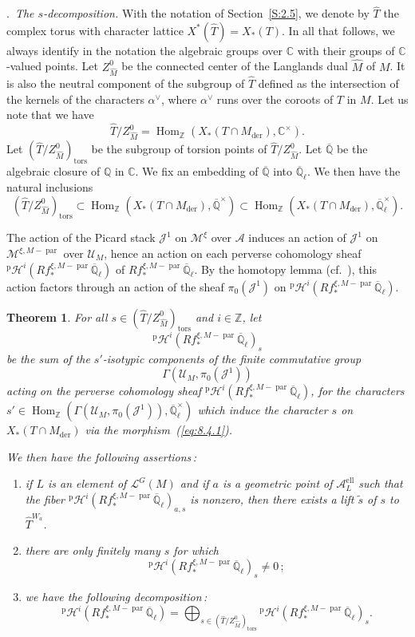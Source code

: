\documentclass[12pt,a4paper,oneside,english,leqno]{smfart}
\makeatletter
\numberwithin{equation}{subsection}
\newcounter{theo}
\numberwithin{theo}{subsection}
\newenvironment{paragr}[1][]{\medskip\refstepcounter{subsection}%
  \par\noindent\hspace*{\parindent}\thesubsection.\ \emph{#1}%
  \@ifundefined{@empty}{}{}\ignorespaces}{\medskip}
\theoremstyle{plain}
\newtheorem{theorem}[theo]{Theorem}
\theoremstyle{definition}
\theoremstyle{remark}
\DeclareMathOperator{\der}{der}
\DeclareMathOperator{\el}{ell}
\DeclareMathOperator{\Hom}{Hom}
\DeclareMathOperator{\tors}{tors}
\DeclareMathOperator{\parab}{par}
\newcommand{\ZZ}{\mathbb{Z}}
\newcommand{\CC}{\mathbb{C}}
\newcommand{\QQ}{\mathbb{Q}}
\newcommand{\Qlb}{\overline{\mathbb{Q}}_{\ell}}
\newcommand{\Qb}{\overline{\mathbb{Q}}}
\newcommand{\uc}{\mathcal{U}}
\newcommand{\mc}{\mathcal{M}}
\newcommand{\lc}{\mathcal{L}}
\newcommand{\hc}{\mathcal{H}}
\newcommand{\Ac}{\mathcal{A}}
\newcommand{\Jc}{\mathcal{J}}
\newcommand{\Tc}{\widehat{T}}
\newcommand{\Mc}{\widehat{M}}
\makeatother
\begin{document}
\begin{paragr}[The $s$-decomposition.]\label{S:8.5}
With the notation of Section~\ref{S:2.5}, we denote by $\Tc$ the complex torus with character lattice $X^*(\Tc)=X_*(T)$. In all that follows, we always identify in the notation the algebraic groups over $\CC$ with their groups of $\CC$-valued points. Let $Z^0_{\Mc}$ be the connected center of the Langlands dual $\Mc$ of $M$. It is also the neutral component of the subgroup of $\Tc$ defined as the intersection of the kernels of the characters $\alpha^\vee$, where $\alpha^\vee$ runs over the coroots of $T$ in $M$. Let us note that we have
$$
\Tc/Z^0_{\Mc}=\Hom_{\ZZ}(X_*(T\cap M_{\der}),\CC^\times).
$$
Let $(\Tc/Z^0_{\Mc})_{\tors}$ be the subgroup of torsion points of $\Tc/Z^0_{\Mc}$. Let $\Qb$ be the algebraic closure of $\QQ$ in $\CC$. We fix an embedding of $\Qb$ into $\Qlb$. We then have the natural inclusions
$$
(\Tc/Z^0_{\Mc})_{\tors}\subset\Hom_{\ZZ}(X_*(T\cap M_{\der}),\Qb^\times)\subset\Hom_{\ZZ}(X_*(T\cap M_{\der}),\Qlb^\times).
$$

The action of the Picard stack $\Jc^1$ on $\mc^\xi$ over $\Ac$ induces an action of $\Jc^1$ on $\mc^{\xi,M-\parab}$ over $\uc_M$, hence an action on each perverse cohomology sheaf ${}^{\mathrm{p}}\hc^i(Rf_*^{\xi,M-\parab}\Qlb)$ of $Rf_*^{\xi,M-\parab}\Qlb$. By the homotopy lemma (cf.\ \cite[Lemma~3.2.3]{Laumon-Ngo}), this action factors through an action of the sheaf $\pi_0(\Jc^1)$ on ${}^{\mathrm{p}}\hc^i(Rf_*^{\xi,M-\parab}\Qlb)$.

\begin{theorem}\label{thm:8.5.1}
For all $s\in(\Tc/Z^0_{\Mc})_{\tors}$ and $i\in\ZZ$, let
$$
{}^{\mathrm{p}}\hc^i(Rf_*^{\xi,M-\parab}\Qlb)_s
$$
be the sum of the $s'$-isotypic components of the finite commutative group
$$
\Gamma(\uc_M,\pi_0(\Jc^1))
$$
acting on the perverse cohomology sheaf ${}^{\mathrm{p}}\hc^i(Rf_*^{\xi,M-\parab}\Qlb)$, for the characters $s'\in\Hom_{\ZZ}(\Gamma(\uc_M,\pi_0(\Jc^1)),\Qlb^\times)$ which induce the character $s$ on $X_*(T\cap M_{\der})$ via the morphism~(\ref{eq:8.4.1}).

We then have the following assertions\,:
\begin{enumerate}
\item if $L$ is an element of $\lc^G(M)$ and if $a$ is a geometric point of $\Ac_L^{\el}$ such that the fiber ${}^{\mathrm{p}}\hc^i(Rf_*^{\xi,M-\parab}\Qlb)_{a,s}$ is nonzero, then there exists a lift $\tilde s$ of $s$ to $\Tc^{W_a}$. \item there are only finitely many $s$ for which
$$
{}^{\mathrm{p}}\hc^i(Rf_*^{\xi,M-\parab}\Qlb)_s\not=0\,;
$$
\item we have the following decomposition\,:
\begin{equation}\label{eq:8.5.1}
{}^{\mathrm{p}}\hc^i(Rf_*^{\xi,M-\parab}\Qlb)=\bigoplus_{s\in(\Tc/Z^0_{\Mc})_{\tors}}{}^{\mathrm{p}}\hc^i(Rf_*^{\xi,M-\parab}\Qlb)_s.
\end{equation}
\end{enumerate}
\end{theorem}


\end{paragr}
\end{document}
